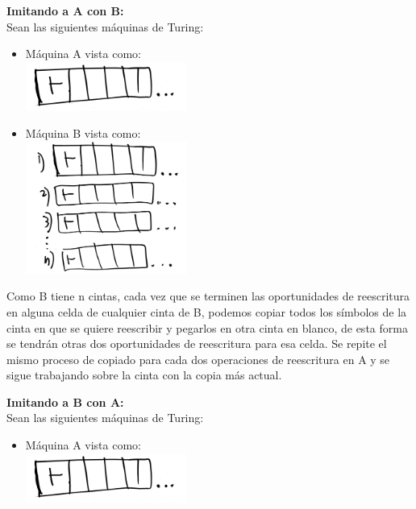 \documentclass[letterpaper,10pt]{article}
\begin{document}
\begin{enumerate}
\begin{itemize}
           \textbf{Imitando a A con B:}\\
           		Sean las siguientes máquinas de Turing:\\
           		\begin{itemize}
           				\item Máquina A vista como:\\
           					\includegraphics[width=150pt]{./images/img4.JPG}\\
           	
           				\item Máquina B vista como:\\
           					\includegraphics[width=150pt]{./images/img5.JPG}\\
           		\end{itemize}
           		Como B tiene n cintas, cada vez que se terminen las oportunidades de reescritura en alguna celda de cualquier cinta de B, podemos copiar todos los símbolos de la cinta en que se quiere reescribir y pegarlos en otra cinta en blanco, de esta forma se tendrán otras dos oportunidades de reescritura para esa celda. Se repite el mismo proceso de copiado para cada dos operaciones de reescritura en A y se sigue trabajando sobre la cinta con la copia más actual.
           		 
           \textbf{Imitando a B con A:}\\
           		Sean las siguientes máquinas de Turing:\\
           		\begin{itemize}
           			\item Máquina A vista como:\\
           				\includegraphics[width=150pt]{./images/img4.JPG}\\
           

\end{itemize}
\end{itemize}
\end{enumerate}
\end{document}
